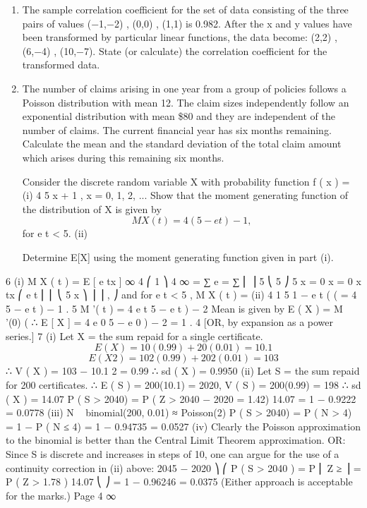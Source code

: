 \documentclass[a4paper,12pt]{article}
\begin{document}
\begin{enumerate}
\item The sample correlation coefficient for the set of data consisting of the three pairs of
values
(−1,−2) , (0,0) , (1,1)
is 0.982. After the x and y values have been transformed by particular linear functions,
the data become:
(2,2) , (6,−4) , (10,−7).
State (or calculate) the correlation coefficient for the transformed data.
\item 
The number of claims arising in one year from a group of policies follows a Poisson
distribution with mean 12. The claim sizes independently follow an exponential distribution with mean \$80 and they are independent of the number of claims. The current financial year has six months remaining.
Calculate the mean and the standard deviation of the total claim amount which arises during this remaining six months.
\iten

Consider the discrete random variable X with probability function
f ( x ) =
(i)
4
5 x + 1
,
x = 0, 1, 2, ...
Show that the moment generating function of the distribution of X is given by
\[M X ( t ) = 4(5 − e t ) − 1 ,\]
for e t < 5.
(ii)

Determine E[X] using the moment generating function given in part (i).
\end{enumerate}
\newpage


6
(i)
M X ( t ) = E [ e tx ]
∞
4 ⎛ 1 ⎞
4 ∞
= ∑ e
=
∑
⎜ ⎟
5 ⎝ 5 ⎠
5 x = 0
x = 0
x
tx
⎛ e t
⎜ ⎜
⎝ 5
x
⎞
⎟ ⎟ ,
⎠
and for e t < 5 ,
M X ( t ) =
(ii)
4 1
5 1 − e t
(
(
= 4 5 − e t
)
− 1
.
5
M '( t ) = 4 e t 5 − e t
)
− 2
Mean is given by E ( X ) = M '(0)
(
∴ E [ X ] = 4 e 0 5 − e 0
)
− 2
=
1
.
4
[OR, by expansion as a power series.]
7
(i)
Let X = the sum repaid for a single certificate.
\[E ( X ) = 10(0.99) + 20(0.01) = 10.1\]
\[E ( X 2 ) = 10 2 (0.99) + 20 2 (0.01) = 103\]
∴ V ( X ) = 103 − 10.1 2 = 0.99 ∴ sd ( X ) = 0.9950
(ii)
Let S = the sum repaid for 200 certificates.
∴ E ( S ) = 200(10.1) = 2020, V ( S ) = 200(0.99) = 198 ∴ sd ( X ) = 14.07
P ( S > 2040) = P ( Z >
2040 − 2020
= 1.42)
14.07
= 1 − 0.9222 = 0.0778
(iii)
N ~ binomial(200, 0.01) ≈ Poisson(2)
P ( S > 2040) = P ( N > 4)
= 1 − P ( N ≤ 4) = 1 − 0.94735 = 0.0527
(iv)
Clearly the Poisson approximation to the binomial is better than the Central
Limit Theorem approximation.
OR:
Since S is discrete and increases in steps of 10, one can argue for the use of a
continuity correction in (ii) above:
2045 − 2020 ⎞
⎛
P ( S > 2040 ) = P ⎜ Z ≥
⎟ = P ( Z > 1.78 )
14.07
⎝
⎠
= 1 − 0.96246 = 0.0375
(Either approach is acceptable for the marks.)
Page 4%
∞
\end{document}
